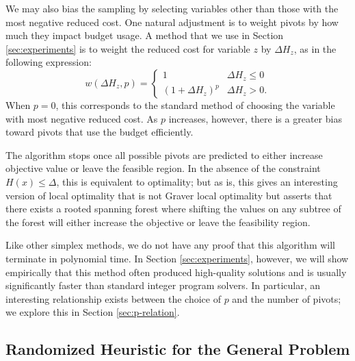 \documentclass[pdflatex,sn-mathphys-num]{sn-jnl}%
\begin{document}
We may also bias the sampling by selecting variables other than those with the most negative reduced cost. One natural adjustment is to weight pivots by how much they impact budget usage. A method that we  use  in Section \ref{sec:experiments} is to weight the reduced cost for variable $z$ by $\Delta H_z$, as in the following expression:
\begin{equation} \label{eq:weighting-scheme}
    w(\Delta H_z,p) = \begin{cases}
        1 & \Delta H_z \le 0 \\
        (1+\Delta H_z)^p & \Delta H_z > 0.
    \end{cases}
\end{equation}
When $p = 0$, this corresponds to the standard method of choosing the variable with most negative reduced cost. As $p$ increases, however, there is a greater bias toward pivots that use the budget efficiently.

The algorithm stops once all possible pivots are predicted to either increase objective value or leave the feasible region. In the absence of the constraint $H(x) \le \Delta$, this is equivalent to optimality; but as is, this gives an interesting version of local optimality that is not Graver local optimality but asserts that there exists a rooted spanning forest where shifting the values on any subtree of the forest will either increase the objective or leave the feasibility region.

Like other simplex methods, we do not have any proof that this algorithm will terminate in polynomial time. In Section \ref{sec:experiments}, however, we will show empirically that this method often produced high-quality solutions and is usually significantly faster than standard integer program solvers. In particular, an interesting relationship exists between the choice of $p$ and the number of pivots; we explore this in Section \ref{sec:p-relation}.



\subsection{Randomized Heuristic for the General Problem}
\end{document}

